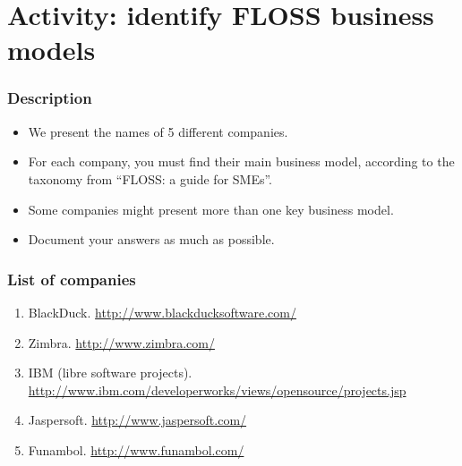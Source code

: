 
\section{Activity: identify FLOSS business models}

\begin{frame}
\frametitle{Description}
\begin{itemize}
  \item We present the names of 5 different companies.
  \item For each company, you must find their main business model, according
to the taxonomy from ``FLOSS: a guide for SMEs''.
  \item Some companies might present more than one key business model.
  \item Document your answers as much as possible.
\end{itemize}
\end{frame}

\begin{frame}
 \frametitle{List of companies}
  \begin{enumerate}
\item BlackDuck.
   \url{http://www.blackducksoftware.com/}
 \item Zimbra.
   \url{http://www.zimbra.com/}
 \item IBM (libre software projects).
   {\footnotesize \url{http://www.ibm.com/developerworks/views/opensource/projects.jsp}}
 \item Jaspersoft.
   \url{http://www.jaspersoft.com/}
 \item Funambol.
   \url{http://www.funambol.com/}
  \end{enumerate}

\end{frame}


